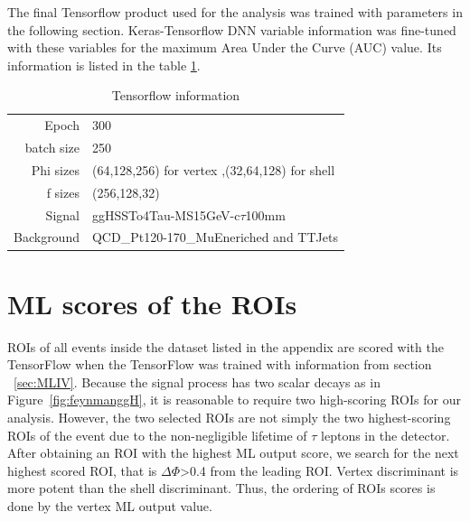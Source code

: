 The final Tensorflow product used for the analysis was trained with parameters in the following section.
Keras-Tensorflow DNN variable information was fine-tuned with these variables for the maximum Area Under the Curve (AUC) value.
Its information is listed in the table \ref{tab:ROIParam}.
\begin{table}[htb]
\caption{Tensorflow information}
\begin{center}
\begin{tabular}{r|l}\hline
Epoch & 300 \\
batch size & 250 \\
Phi sizes & (64,128,256) for vertex ,(32,64,128) for shell \\
f sizes & (256,128,32) \\
Signal & ggHSSTo4Tau-MS15GeV-c$\tau$100mm  \\
Background & QCD\_Pt120-170\_MuEneriched and TTJets \\
 \hline
 \hline
\end{tabular}
\label{tab:ROIParam}
\end{center}
\end{table}


\section{ML scores of the ROIs}
ROIs of all events inside the dataset listed in the appendix are scored with the TensorFlow when the TensorFlow was trained with information from section ~\ref{sec:MLIV}.
Because the signal process has two scalar decays as in Figure~\ref{fig:feynmanggH}, it is reasonable to require two high-scoring ROIs for our analysis.
However, the two selected ROIs are not simply the two highest-scoring ROIs of the event due to the non-negligible lifetime of $\tau$ leptons in the detector.
After obtaining an ROI with the highest ML output score, we search for the next highest scored ROI, that is $\Delta\Phi$>0.4 from the leading ROI.
Vertex discriminant is more potent than the shell discriminant.
Thus, the ordering of ROIs scores is done by the vertex ML output value.

